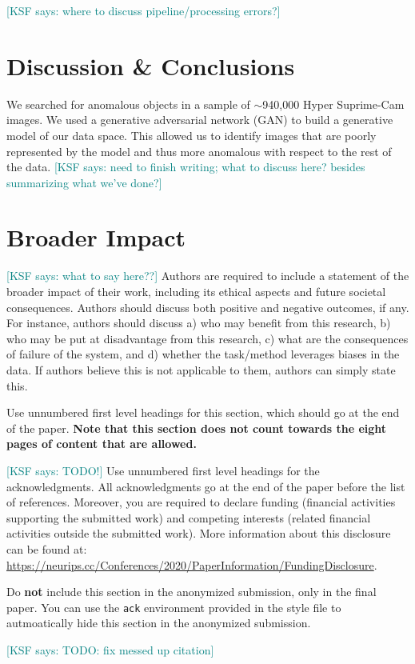 \documentclass{article}
\newcommand{\KSF}[1]{\textcolor{teal}{{[KSF says: #1]}}}
\begin{document}
\KSF{where to discuss pipeline/processing errors?}

\section{Discussion \& Conclusions}

We searched for anomalous objects in a sample of $\sim$940,000 Hyper Suprime-Cam images.
We used a generative adversarial network (GAN) to build a generative model of our data space.
This allowed us to identify images that are poorly represented by the model and thus more anomalous with respect to the rest of the data.
\KSF{need to finish writing; what to discuss here? besides summarizing what we've done?}

\section*{Broader Impact}

\KSF{what to say here??}
Authors are required to include a statement of the broader impact of their work, including its ethical aspects and future societal consequences. 
Authors should discuss both positive and negative outcomes, if any. For instance, authors should discuss a) 
who may benefit from this research, b) who may be put at disadvantage from this research, c) what are the consequences of failure of the system, and d) whether the task/method leverages
biases in the data. If authors believe this is not applicable to them, authors can simply state this.

Use unnumbered first level headings for this section, which should go at the end of the paper. {\bf Note that this section does not count towards the eight pages of content that are allowed.}

\begin{ack}
\KSF{TODO!}
Use unnumbered first level headings for the acknowledgments. All acknowledgments
go at the end of the paper before the list of references. Moreover, you are required to declare 
funding (financial activities supporting the submitted work) and competing interests (related financial activities outside the submitted work). 
More information about this disclosure can be found at: \url{https://neurips.cc/Conferences/2020/PaperInformation/FundingDisclosure}.


Do {\bf not} include this section in the anonymized submission, only in the final paper. You can use the \texttt{ack} environment provided in the style file to autmoatically hide this section in the anonymized submission.
\end{ack}

\KSF{TODO: fix messed up citation}


\end{document}
